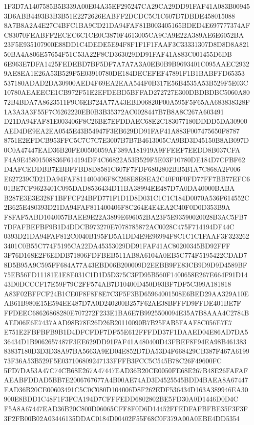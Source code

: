 \documentclass[UTF8,fontset=fandol,zihao=-4,a4paper]{ctexart}
\begin{document}
{{1F3D7A1407585B5B339A00E04A35EF295247CA29CA29DD91FAF41A083B009453D6ABB4493B3B3B51E2272626EABFF2DCDC5C1C607D7DBDE458015088
8A7B8A2A4E27C4BFC1BA9CD21DA94FAF81B003405165BDED4E697777374AFC83070FEABFF2ECEC6C1CE0C3870F4613005CA9CA9E22A389AE6E6052BA
23F5E935107900E88DD1C4DEDE5E94F8F1F1F1FAAF3C33331307D8D8D8A82150BA4A806E57654F51C53A22F8CD363029DD91FAF41A883C001455D6DB
6E963E7DFA1425FEDEBD7BF5DF7A7A7A3A0EB0B9B9693401C095AAEC29329AE8EA1E26A53B529F5E03910780DE184DECEFEF47891F1B1BABFFD65353
537180ADAD2DA30900AED4F69EA2EAA544F0B317E56B4535A53B529F5E03C10780AEAEECE1CB972F51E2EFDEBD5BFFAD272727E300DBDBDBC5060A80
72B4BDA7A8623511F9C6EB724A77A43EBD06820F00A595F5F65AA683838328F1A3A3A3F55F7C6262220EB0B3B35372AC0028447B7B8A8C267A603491
D21DA94FAF81E003406F8C26BE7EFDDAEC68E2C183077180DDDD5DA30900AED4DE9EA2EA0545E43B54947F3EB629DD91FAF41A883F007475650F8787
8751E2EFDCB953FFC5C7C7C7E3007B7B7B4613005CA9BD3D45150B8AB097D0C0A47447EAD36B20FE00506059AF389A181919A9FFEEF7EEDD8B037CFA
F4A9E45801508836F614194DF4C66822A53B529F5E03F10780DE184D7CFBF62D4AFCEDDBB7EBBFFBD8D8581C607F7FDF6802802BB5B1A7C868A2F006
E627239CD21DA94FAF811400406F8C268E8E8EA2C40F0F0FD77FF7BB77EFC601BE7CF9623401C095DAD8536434D11BA38994EE487D7A0DA40000BABA
B287E3E3E328F1BFFCF24BFD771F1D1D8D031C1C1C184D0070A536F614552C2B625E480393D21DA94FAF811400406F8C264E4E4EA2C40F0D0D353B9A
F8FAF5ABD1040057BAEE9E22A3899E696052BA23F5E93590020028B3AC5FB77DFAFBEFBF9B1D4DDCB973270E7078785872AC0028C475F714194DF44C
0393D21DA94FAF812C0040B195FD5A1DD4E9E96994F8C1C1C1FAAF3F3232623401C0B55C774F5195CA22DA45353029DD91FAF41AC80200345BD92FFF
3F76D168E2F6EDDB71806FDFBEB511AB8A6104A0EB5C774F5195422CDAD78D5B95A9C595FF684A77A43EBD06B200009D2EEBB9FE83CB9D9D9D4589BF
75EB56FD11181E1E8E031C1D1D5D375C3FD95B560F1400658E267E664F91D1443D0DCCCF17E59F79C2FF574AB7D10400D450D93BF7DF5C399A181818
A83F02BFFCF24B1CE0F8F8F8E7C3F5F3BD65964001508E6BED29AA329A10EAB61B980E15E594EE487D7A0D240200B257F62AE38BFFFD9FFDE401BE7F
FFDEEC68626868280E707272F233E1BA6E7B9925500094E35A7B8AAA4C2784BAED06E6E7437AAD98B78E26D26B20110090B7B25FAB5FAAF8C056E7E7
E751E2FBFBFB9B1D4DFCFDF7DF55E612FFFDD37F1DAAED04E86AD7DA536434D1B9062657487F3EE629DD91FAF41A480400D43FBEF8F94EA98B461383
83837180D3D3D38A97BA5663A9ED04E852D7DA53D4F668429CB387F467A619973F36A53B529F5E037106809247133FFFB3FCC5C545B78C26F49600FC
5FD7DA53A47C74CB68E267A47447EAD36B20CE0050FE68E267B48E26FAFAFAEABFDDAD5BB7E2006767677A4B00AE74AD3D4525545BDD4BAEA8A67447
EAD36B20CE00603491C5C0C080D104006D8F262EDF536434D163A389946EA30900E8BDD1C48F1F3FCA194D7CFFFEDD6802802BE5FD30A0D1446D0D4C
F5A8A67447EAD36B20C800D06065CFF8F0D6D14452FFEDFAFBFBE35F3F3F3F2FB00B02A03446135DDAC0184D00402F55F68C0F379A00A0EBE4DD5354
}}
\end{document}
